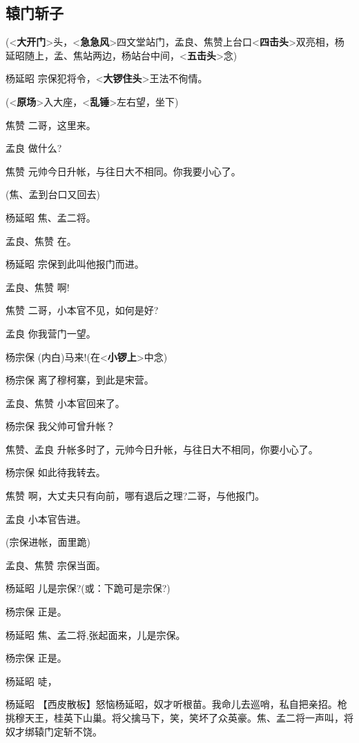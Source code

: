\newpage
\hypertarget{ux8f95ux95e8ux65a9ux5b50}{%
\subsection{辕门斩子}\label{ux8f95ux95e8ux65a9ux5b50}}

(\textless{}\textbf{大开门}\textgreater{}头，\textless{}\textbf{急急风}\textgreater{}四文堂站门，孟良、焦赞上台口\textless{}\textbf{四击头}\textgreater{}双亮相，杨延昭随上，孟、焦站两边，杨站台中间，\textless{}\textbf{五击头}\textgreater{}念)

杨延昭
宗保犯将令，\textless{}\textbf{大锣住头}\textgreater{}王法不徇情。

(\textless{}\textbf{原场}\textgreater{}入大座，\textless{}\textbf{乱锤}\textgreater{}左右望，坐下)

焦赞 二哥，这里来。

孟良 做什么?

焦赞 元帅今日升帐，与往日大不相同。你我要小心了。

(焦、孟到台口又回去)

杨延昭 焦、孟二将。

孟良、焦赞 在。

杨延昭 宗保到此叫他报门而进。

孟良、焦赞 啊!

焦赞 二哥，小本官不见，如何是好?

孟良 你我营门一望。

杨宗保 (内白)马来!(在\textless{}\textbf{小锣上}\textgreater{}中念)

杨宗保 离了穆柯寨，到此是宋营。

孟良、焦赞 小本官回来了。

杨宗保 我父帅可曾升帐？

焦赞、孟良 升帐多时了，元帅今日升帐，与往日大不相同，你要小心了。

杨宗保 如此待我转去。

焦赞 啊，大丈夫只有向前，哪有退后之理?二哥，与他报门。

孟良 小本官告进。

(宗保进帐，面里跪)

孟良、焦赞 宗保当面。

杨延昭 儿是宗保?(或：下跪可是宗保?)

杨宗保 正是。

杨延昭 焦、孟二将,张起面来，儿是宗保。

杨宗保 正是。

杨延昭 唗，

杨延昭
【西皮散板】怒恼杨延昭，奴才听根苗。我命儿去巡哨，私自把亲招。枪挑穆天王，桂英下山巢。将父擒马下，笑，笑坏了众英豪。焦、孟二将一声叫，将奴才绑辕门定斩不饶。


